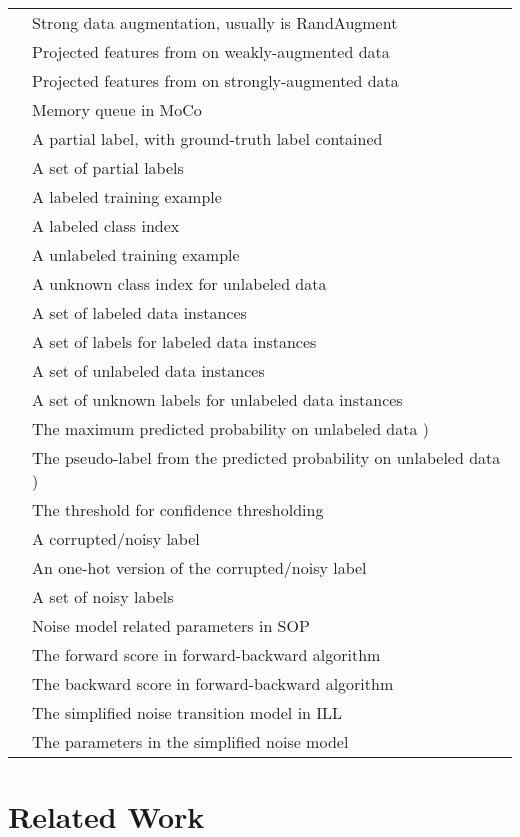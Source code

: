 \begin{table}[h!]
{\begin{tabular}{@{}l|l@{}}
     & Strong data augmentation, usually is RandAugment \citep{cubuk2020randaugment} \\
     & Projected features from  on weakly-augmented data \\
     & Projected features from  on strongly-augmented data \\
     & Memory queue in MoCo \citep{moco2020} \\
     &  A partial label, with ground-truth label contained \\
     & A set of partial labels \\ 
     & A labeled training example \\ 
     & A labeled class index \\ 
     & A unlabeled training example \\ 
     & A unknown class index for unlabeled data \\ 
      &   A set of labeled data instances       \\
            &   A set of labels for labeled data instances            \\ 
      &   A set of unlabeled data instances       \\
            &   A set of unknown labels for unlabeled data instances            \\ 
     & The maximum predicted probability on unlabeled data ) \\ 
     & The pseudo-label from the predicted probability on unlabeled data )\\
     & The threshold for confidence thresholding \\ 
     & A corrupted/noisy label \\
     & An one-hot version of the corrupted/noisy label \\
     & A set of noisy labels \\ 
      & Noise model related parameters in SOP \citep{sopliu22w} \\
     & The forward score in forward-backward algorithm \\ 
     & The backward score in forward-backward algorithm \\ 
     & The simplified noise transition model in ILL \\ 
     & The parameters in the simplified noise model \\ 
    \bottomrule
\end{tabular}}
\end{table}

\section{Related Work}
\label{sec:appen-related}

